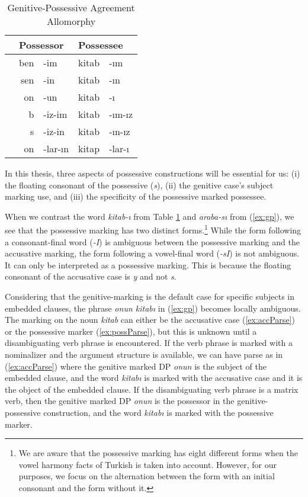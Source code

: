 \begin{table}[hbt!]
  \caption{Genitive-Possessive Agreement Allomorphy}
  \vspace{10pt}
  \begin{tabular}{lrlrl}
    \hline
                            & \multicolumn{2}{l}{Possessor} & \multicolumn{2}{l}{Possessee}   \\ \hline
    \Fsg{} & ben&-{im}    & kitab&-{{\i}m}    \\
    \Ssg{} & sen&-{in}    & kitab&-{{\i}n}    \\
    \Tsg{} & on&-{un}     & kitab&-{{\i}}     \\
    \Fpl{} & b&-{iz-im}   & kitab&-{{\i}m-{\i}z} \\
    \Spl{} & s&-{iz-in}   & kitab&-{{\i}n-{\i}z} \\
    \Tpl{} & on&-{lar-{\i}n} & kitap&-{lar-{\i}} \\ \hline
  \end{tabular}

  \label{tab:possAgreement}
\end{table}

In this thesis, three aspects of possessive constructions will be essential for us: (i) the floating consonant of the possessive (\emph{s}), (ii) the genitive case's subject marking use, and (iii) the specificity of the possessive marked possessee. 

When we contrast the word \emph{kitab-{\i}} from Table \ref{tab:possAgreement} and \emph{araba-s{\i}} from (\ref{ex:gp}), we see that the possessive marking has two distinct forms.\footnote{We are aware that the possessive marking has eight different forms when the vowel harmony facts of Turkish is taken into account. However, for our purposes, we focus on the alternation between the form with an initial consonant and the form without it.} While the form following a consonant-final word (\emph{-I}) is ambiguous between the possessive marking and the accusative marking, the form following a vowel-final word (\emph{-sI}) is not ambiguous. It can only be interpreted as a possessive marking. This is because the floating consonant of the accusative case is \emph{y} and not \emph{s}. 

Considering that the genitive-marking is the default case for specific subjects in embedded clauses, the phrase \emph{onun kitab{\i}} in (\ref{ex:gp}) becomes locally ambiguous. The marking on the noun \emph{kitab} can either be the accusative case (\ref{ex:accParse}) or the possessive marker (\ref{ex:possParse}), but this is unknown until a disambiguating verb phrase is encountered. If the verb phrase is marked with a nominalizer and the argument structure is available, we can have parse as in (\ref{ex:accParse}) where the genitive marked DP \emph{onun} is the subject of the embedded clause, and the word \emph{kitab{\i}} is marked with the accusative case and it is the object of the embedded clause. If the disambiguating verb phrase is a matrix verb, then the genitive marked DP \emph{onun} is the possessor in the genitive-possessive construction, and the word \emph{kitab{\i}} is marked with the possessive marker.


